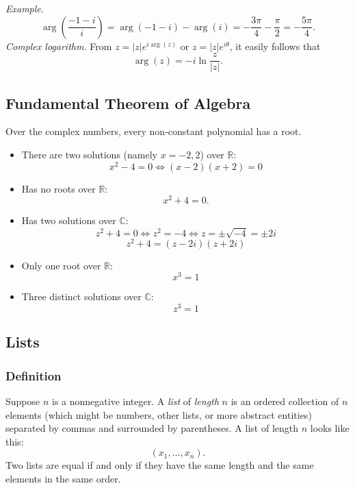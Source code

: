 \documentclass[11pt]{article}
\begin{document}
    \emph{Example.} \[\arg \left(\frac{-1 -i}{i}\right) = \arg (-1 - i) - \arg (i) = - \frac{3 \pi}{4} - \frac{\pi}{2} = - \frac{5 \pi}{4}.\] \emph{Complex logarithm.} From \(z = |z| e^{i \arg(z)}\) or \(z = |z| e^{i \theta}\), it easily follows that \[\arg(z) = -i \ln \frac{z}{|z|}.\]

    \pagebreak

    \subsection{Fundamental Theorem of Algebra}

    Over the complex numbers, every non-constant polynomial has a root.
    \begin{itemize}
        \item There are two solutions (namely \(x = -2, 2\)) over \(\mathbb{R}\): \[x^2 - 4 = 0 \Leftrightarrow (x-2)(x+2) = 0 \]
        \item Has no roots over \(\mathbb{R}\): \[x^2 + 4 = 0.\]
        \item Has two solutions over \(\mathbb{C}\): \[z^2 + 4 = 0 \Leftrightarrow z^2 = -4 \Leftrightarrow z = \pm \sqrt{-4} = \pm 2i\] \[z^2 + 4 = (z - 2i)(z + 2i)\]
        \item Only one root over \(\mathbb{R}\): \[x^3 = 1\]
        \item Three distinct solutions over \(\mathbb{C}\): \[z^3 = 1\]
    \end{itemize}

    \subsection{Lists}

    \subsubsection{Definition}

    Suppose $n$ is a nonnegative integer. A \emph{list} of \emph{length} $n$ is an ordered collection of $n$ elements (which might be numbers, other lists, or more abstract entities) separated by commas and surrounded by parentheses. A list of length $n$ looks like this: \[(x_1, \dots, x_n).\] Two lists are equal if and only if they have the same length and the same elements in the same order.
\end{document}
